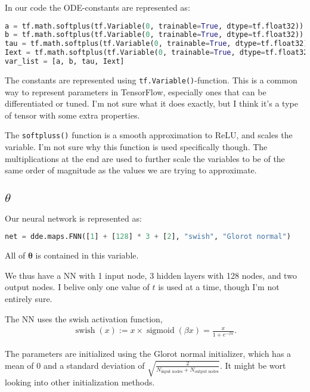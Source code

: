 \documentclass[a4paper]{article}
\begin{document}
In our code the ODE-constants are represented as:
\begin{lstlisting}[language=python]
a = tf.math.softplus(tf.Variable(0, trainable=True, dtype=tf.float32)) * .1
b = tf.math.softplus(tf.Variable(0, trainable=True, dtype=tf.float32))
tau = tf.math.softplus(tf.Variable(0, trainable=True, dtype=tf.float32)) * 10
Iext = tf.math.softplus(tf.Variable(0, trainable=True, dtype=tf.float32)) * .1
var_list = [a, b, tau, Iext]
\end{lstlisting}
The constants are represented using \lstinline|tf.Variable()|-function. This is a common way to represent parameters in TensorFlow, especially ones that can be differentiated or tuned.
I'm not sure what it does exactly, but I think it's a type of tensor with some extra properties. 

The \lstinline|softpluss()| function is a smooth approximation to ReLU, and scales the variable. I'm not sure why this function is used specifically though. 
The multiplications at the end are used to further scale the variables to be of the same order of magnitude as the values we are trying to approximate. 


\subsection{$\theta$}

Our neural network is represented as:
\begin{lstlisting}[language=python]
net = dde.maps.FNN([1] + [128] * 3 + [2], "swish", "Glorot normal")
\end{lstlisting}
All of $\boldsymbol{\theta}$ is contained in this variable. 

We thus have a NN with 1 input node, 3 hidden layers with 128 nodes, and two output nodes. 
I belive only one value of $t$ is used at a time, though I'm not entirely sure. 

The NN uses the swish activation function,
\begin{align}
	\operatorname{swish}(x):=x \times \operatorname{sigmoid}(\beta x)=\frac{x}{1+e^{-\beta x}}.
\end{align}

The parameters are initialized using the Glorot normal initializer, which has a mean of 0 and a standard deviation of $\sqrt{\frac{2}{N_{\text{input nodes}} + N_{\text{output nodes}}}}$. It might be wort looking into other initialization methods. 
\end{document}
